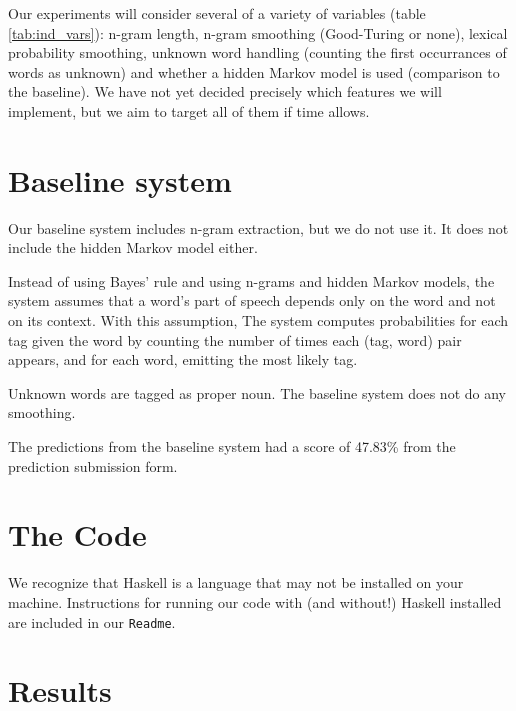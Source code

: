 \documentclass{article}
\begin{document}
Our experiments will consider several of a variety of variables (table \ref{tab:ind_vars}): n-gram length,
n-gram smoothing (Good-Turing or none), lexical probability smoothing, unknown
word handling (counting the first occurrances of words as unknown) and
whether a hidden Markov model is used (comparison to the baseline).
We have not yet decided precisely which features we will implement, but we
aim to target all of them if time allows.

\section{Baseline system}
Our baseline system includes n-gram extraction,
but we do not use it.
It does not include the hidden Markov model either.

Instead of using Bayes' rule and using n-grams and hidden Markov models,
the system assumes that a word's part of speech depends only
on the word and not on its context. With this assumption,
The system computes probabilities for each tag given the word by counting the
number of times each (tag, word) pair appears, and for each word, emitting the
most likely tag.

Unknown words are tagged as proper noun.
The baseline system does not do any smoothing.

The predictions from the baseline system had a score of 47.83\%
from the prediction submission form.


\section{The Code}

We recognize that Haskell is a language that may not be installed on your
machine.  Instructions for running our code with (and without!) Haskell
installed are included in our \verb+Readme+.

\section{Results}
\end{document}
